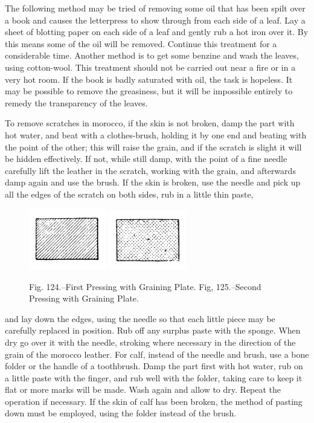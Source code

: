 \documentclass[twoside]{book}
\begin{document}
The following method may be tried of removing
some oil that has been spilt over a book and causes
the letterpress to show through from each side of
a leaf. Lay a sheet of blotting paper on each side
of a leaf and gently rub a hot iron over it. By this
means some of the oil will be removed. Continue
this treatment for a considerable time. Another
method is to get some benzine and wash the leaves,
using cotton-wool. This treatment should not be
carried out near a fire or in a very hot room. If the
book is badly saturated with oil, the task is hopeless.
It may be possible to remove the greasiness, but it
will be impossible entirely to remedy the transparency
of the leaves.

\pagebreak

To remove scratches in morocco, if the skin is
not broken, damp the part with hot water, and beat
with a clothes-brush, holding it by one end and
beating with the point of the other; this will raise
the grain, and if the scratch is slight it will be
hidden effectively. If not, while still damp, with
the point of a fine needle carefully lift the leather
in the scratch, working with the grain, and afterwards
damp again and use the brush. If the skin is
broken, use the needle and pick up all the edges of
the scratch on both sides, rub in a little thin paste,
	\begin{figure}[h]
		\centering
		\includegraphics[width=0.3\textwidth]{Figures/_124.png}
		\includegraphics[width=0.3\textwidth]{Figures/_125.png}
		\caption*{
			Fig. 124.--First Pressing with Graining Plate.
			Fig, 125.--Second Pressing with Graining Plate.
		}
	\end{figure}
and lay down the edges, using the needle so that
each little piece may be carefully replaced in position.
Rub off any surplus paste with the sponge.
When dry go over it with the needle, stroking where
necessary in the direction of the grain of the
morocco leather. For calf, instead of the needle
and brush, use a bone folder or the handle of a
toothbrush. Damp the part first with hot water, rub
on a little paste with the finger, and rub well with
the folder, taking care to keep it flat or more marks
will be made. Wash again and allow to dry. Repeat
the operation if necessary. If the skin of calf
has been broken, the method of pasting down must
be employed, using the folder instead of the brush.
\end{document}
